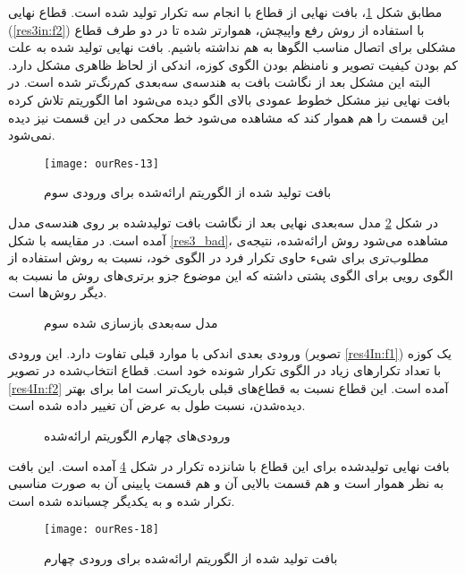 مطابق شکل \ref{res3Out}، بافت نهایی از قطاع با انجام سه تکرار تولید شده است. قطاع نهایی (\ref{res3in:f2}) با استفاده از روش رفع واپیچش، هموار‌تر شده تا در دو طرف قطاع مشکلی برای اتصال مناسب الگو‌ها به هم نداشته باشیم. بافت نهایی تولید شده به علت کم بودن کیفیت تصویر و نامنظم بودن الگوی کوزه، اندکی از لحاظ ظاهری مشکل دارد. البته این مشکل بعد از نگاشت بافت به هندسه‌ی سه‌بعدی کم‌رنگ‌تر شده است. در بافت نهایی نیز مشکل خطوط عمودی بالای الگو دیده می‌شود اما الگوریتم تلاش کرده این قسمت را هم هموار کند که مشاهده می‌شود خط محکمی در این قسمت نیز دیده نمی‌شود.
\begin{figure}[h!]
	\centering
	\texttt{[image: ourRes-13]}
	\caption{بافت تولید شده از الگوریتم ارائه‌شده برای ورودی سوم}
	\label{res3Out}
\end{figure}

در شکل \ref{res3_3DOut} مدل سه‌بعدی نهایی بعد از نگاشت بافت تولید‌شده بر روی هندسه‌ی مدل آمده است. در مقایسه با شکل \ref{res3_bad}، مشاهده می‌شود روش ارائه‌شده، نتیجه‌ی مطلوب‌تری برای شیء حاوی تکرار فرد در الگوی خود، نسبت به روش استفاده از الگوی رویی برای الگوی پشتی داشته که این موضوع جزو برتری‌های روش ما نسبت به دیگر روش‌ها است.
\begin{figure}[h!]
	\centering
	\qquad
	\caption{مدل سه‌بعدی بازسازی شده سوم}
	\label{res3_3DOut}
\end{figure}
\newline
ورودی بعدی اندکی با موارد قبلی تفاوت دارد. این ورودی (تصویر \ref{res4In:f1}) یک کوزه با تعداد تکرار‌های زیاد در الگوی تکرار شونده خود است. قطاع انتخاب‌شده در تصویر \ref{res4In:f2} آمده است. این قطاع نسبت به قطاع‌های قبلی باریک‌تر است اما برای بهتر دیده‌شدن، نسبت طول به عرض آن تغییر داده ‌شده است.
\begin{figure}[h!]
	\centering
	\qquad
	\caption{ورودی‌های چهارم الگوریتم ارائه‌شده}
	\label{res4In}
\end{figure}
\newline
بافت نهایی تولید‌شده برای این قطاع با شانزده تکرار در شکل \ref{res4Out} آمده است. این بافت به نظر هموار است و هم قسمت بالایی آن و هم قسمت پایینی آن به صورت مناسبی تکرار شده و به یکدیگر چسبانده شده است.
\begin{figure}[h!]
	\centering
	\texttt{[image: ourRes-18]}
	\caption{بافت تولید شده از الگوریتم ارائه‌شده برای ورودی چهارم}
	\label{res4Out}
\end{figure}

